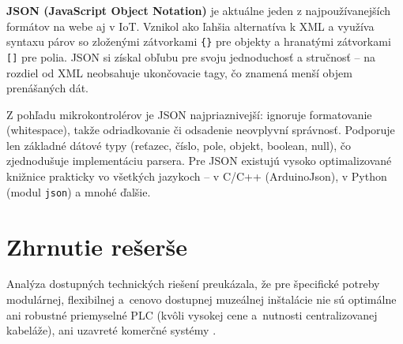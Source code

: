 \textbf{JSON (JavaScript Object Notation)} je aktuálne jeden z najpoužívanejších formátov na webe aj v IoT. Vznikol ako ľahšia alternatíva k XML a využíva syntaxu párov  so zloženými zátvorkami \texttt{\{\}} pre objekty a hranatými zátvorkami \texttt{[]} pre polia. JSON si získal obľubu pre svoju jednoduchosť a stručnosť -- na rozdiel od XML neobsahuje ukončovacie tagy, čo znamená menší objem prenášaných dát.

Z pohľadu mikrokontrolérov je JSON najpriaznivejší: ignoruje formatovanie (whitespace), takže odriadkovanie či odsadenie neovplyvní správnosť. Podporuje len základné dátové typy (reťazec, číslo, pole, objekt, boolean, null), čo zjednodušuje implementáciu parsera. Pre JSON existujú vysoko optimalizované knižnice prakticky vo všetkých jazykoch -- v C/C++ (ArduinoJson), v Python (modul \texttt{json}) a mnohé ďalšie.

\section{Zhrnutie rešerše}
\label{zhrnutie-reserse}

Analýza dostupných technických riešení preukázala, že pre špecifické potreby modulárnej, flexibilnej a~cenovo dostupnej muzeálnej inštalácie nie sú optimálne ani robustné priemyselné PLC (kvôli vysokej cene a~nutnosti centralizovanej kabeláže), ani uzavreté komerčné systémy .